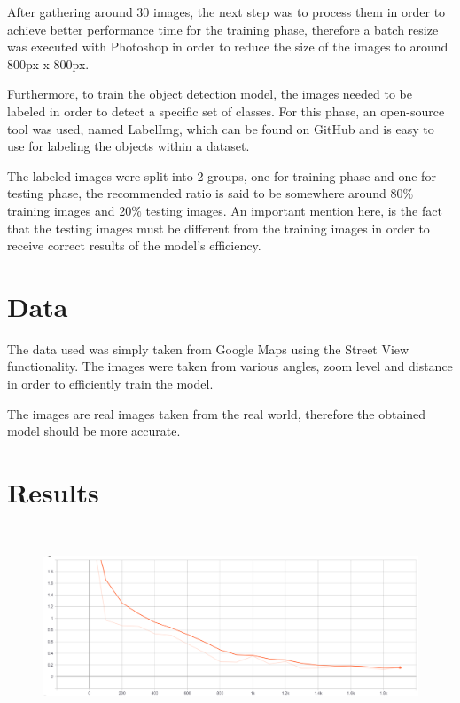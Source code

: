 \documentclass[12pt]{report}
\renewcommand{\_}{\kern-1.5pt\textunderscore\kern-1.5pt}
\begin{document}
After gathering around 30 images, the next step was to process them in order to achieve better performance time for the training phase, therefore a batch resize was executed with Photoshop in order to reduce the size of the images to around 800px x 800px. \par

Furthermore, to train the object detection model, the images needed to be labeled in order to detect a specific set of classes. For this phase, an open-source tool was used, named LabelImg, which can be found on GitHub and is easy to use for labeling the objects within a dataset.\par

The labeled images were split into 2 groups, one for training phase and one for testing phase, the recommended ratio is said to be somewhere around 80$\%$  training images and 20$\%$  testing images. An important mention here, is the fact that the testing images must be different from the training images in order to receive correct results of the model’s efficiency.\par

\section{Data}
The data used was simply taken from Google Maps using the Street View functionality. The images were taken from various angles, zoom level and distance in order to efficiently train the model.\par

The images are real images taken from the real world, therefore the obtained model should be more accurate.\par

\section{Results}



\begin{figure}[H]
	\begin{Center}
		\includegraphics[width=6.27in,height=2.33in]{./media/image1.png}
	\end{Center}
\end{figure}
\end{document}
